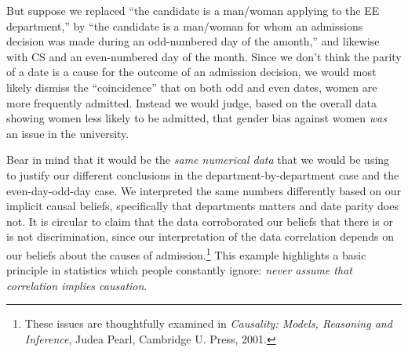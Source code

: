But suppose we replaced ``the candidate is a man/woman applying to the
EE department,'' by ``the candidate is a man/woman for whom an
admissions decision was made during an odd-numbered day of the
amonth,'' and likewise with CS and an even-numbered day of the month.
Since we don't think the parity of a date is a cause for the outcome
of an admission decision, we would most likely dismiss the
``coincidence'' that on both odd and even dates, women are more
frequently admitted.  Instead we would judge, based on the overall
data showing women less likely to be admitted, that gender bias
against women \emph{was} an issue in the university.

Bear in mind that it would be the \emph{same numerical data} that we
would be using to justify our different conclusions in the
department-by-department case and the even-day-odd-day case.  We
interpreted the same numbers differently based on our implicit causal
beliefs, specifically that departments matters and date parity does not.
It is circular to claim that the data corroborated our beliefs that
there is or is not discrimination, since our interpretation of the
data correlation depends on our beliefs about the causes of
admission.\footnote{These issues are thoughtfully examined in
  \emph{Causality: Models, Reasoning and Inference}, Judea Pearl,
  Cambridge U. Press, 2001.}  This example highlights a basic
principle in statistics which people constantly ignore: \emph{never
  assume that correlation implies causation}.

